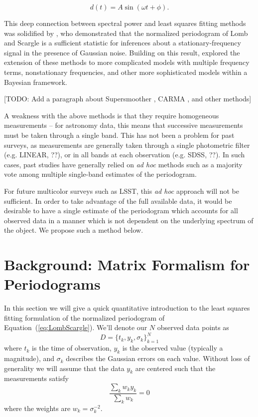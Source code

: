\documentclass[12pt,preprint]{aastex}
\newcommand{\todo}[1]{{\color{red} [TODO: #1]}}
\newcommand{\foreign}[1]{{\it #1}}
\newcommand{\adhoc}{\foreign{ad hoc}}
\newcommand{\Eq}[1]{Equation~(\ref{eq:#1})}
\newcommand{\eq}[1]{\Eq{#1}}
\newcommand{\eqlabel}[1]{\label{eq:#1}}
\begin{document}
\begin{equation}
  \eqlabel{SingleModel}
  d(t) = A\sin(\omega t + \phi).
\end{equation}

This deep connection between spectral power and least squares fitting methods was solidified by \citep{Jaynes87}, who demonstrated that the normalized periodogram of Lomb and Scargle is a sufficient statistic for inferences about a stationary-frequency signal in the presence of Gaussian noise. Building on this result, \citep{Bretthorst88} explored the extension of these methods to more complicated models with multiple frequency terms, nonstationary frequencies, and other more sophisticated models within a Bayesian framework.

\todo{Add a paragraph about Supersmoother \citep{Reimann94}, CARMA \citep{Kelly14}, and other methods}

A weakness with the above methods is that they require homogeneous measurements -- for astronomy data, this means that successive measurements must be taken through a single band. This has not been a problem for past surveys, as measurements are generally taken through a single photometric filter (e.g. LINEAR, ??), or in all bands at each observation (e.g. SDSS, ??). In such cases, past studies have generally relied on \adhoc{} methods such as a majority vote among multiple single-band estimates of the periodogram.

For future multicolor surveys such as LSST, this \adhoc{} approach will not be sufficient. In order to take advantage of the full available data, it would be desirable to have a single estimate of the periodogram which accounts for all observed data in a manner which is not dependent on the underlying spectrum of the object. We propose such a method below.


\section{Background: Matrix Formalism for Periodograms}

In this section we will give a quick quantitative introduction to the least squares fitting formulation of the normalized periodogram of \eq{LombScargle}. We'll denote our $N$ observed data points as
\begin{equation}
  D = \{t_k, y_k, \sigma_k\}_{k=1}^N
\end{equation}
where $t_k$ is the time of observation, $y_k$ is the observed value (typically a magnitude), and $\sigma_k$ describes the Gaussian errors on each value. Without loss of generality we will assume that the data $y_k$ are centered such that the measurements satisfy
\begin{equation}
  \eqlabel{ycentered}
  \frac{\sum_k w_ky_k}{\sum_k w_k} = 0
\end{equation}
where the weights are $w_k = \sigma_k^{-2}$.
\end{document}
